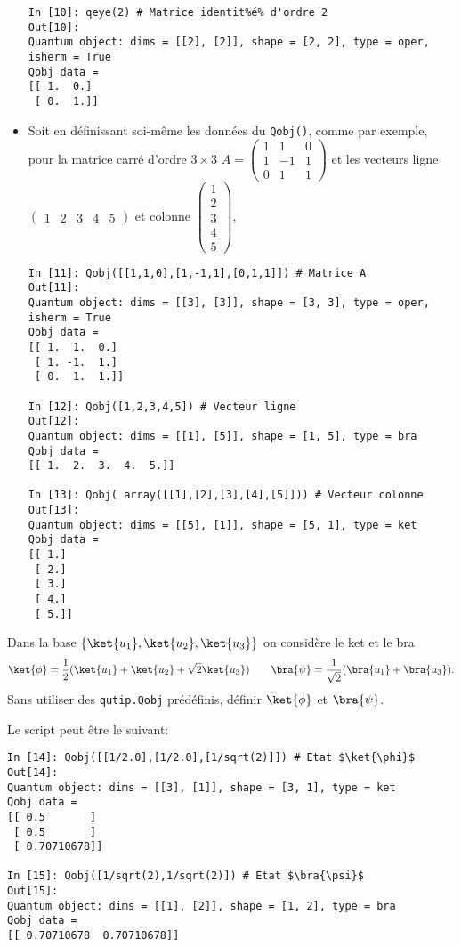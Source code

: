 \begin{itemize}
\begin{lstlisting}
In [10]: qeye(2) # Matrice identit%é% d'ordre 2
Out[10]: 
Quantum object: dims = [[2], [2]], shape = [2, 2], type = oper, isherm = True
Qobj data =
[[ 1.  0.]
 [ 0.  1.]]
\end{lstlisting}

\item Soit en définissant soi-même les données du \texttt{Qobj()}, comme par 
exemple, pour la matrice carré d'ordre $3\times3$ $A =\begin{pmatrix}
1&1&0\\1&-1&1\\0&1&1\end{pmatrix}$ et les vecteurs ligne 
$\begin{pmatrix}1&2&3&4&5\end{pmatrix}$ et colonne 
$\begin{pmatrix}1\\2\\3\\4\\5\end{pmatrix}$,
\begin{lstlisting}
In [11]: Qobj([[1,1,0],[1,-1,1],[0,1,1]]) # Matrice A
Out[11]: 
Quantum object: dims = [[3], [3]], shape = [3, 3], type = oper, isherm = True
Qobj data =
[[ 1.  1.  0.]
 [ 1. -1.  1.]
 [ 0.  1.  1.]]

In [12]: Qobj([1,2,3,4,5]) # Vecteur ligne
Out[12]: 
Quantum object: dims = [[1], [5]], shape = [1, 5], type = bra
Qobj data =
[[ 1.  2.  3.  4.  5.]]

In [13]: Qobj( array([[1],[2],[3],[4],[5]])) # Vecteur colonne
Out[13]: 
Quantum object: dims = [[5], [1]], shape = [5, 1], type = ket
Qobj data =
[[ 1.]
 [ 2.]
 [ 3.]
 [ 4.]
 [ 5.]]
\end{lstlisting}
\end{itemize}

\begin{exercise}
Dans la base $\{\ket{u_1},\ket{u_2},\ket{u_3}\}$ on considère le ket et le bra 
\begin{equation}
\ket{\phi}=\dfrac{1}{2}(\ket{u_1}+\ket{u_2}+\sqrt{2}\ket{u_3}) \qquad 
\bra{\psi}=\dfrac{1}{\sqrt{2}}(\bra{u_1}+\bra{u_3}).
\end{equation}
Sans utiliser des \texttt{qutip.Qobj} prédéfinis, définir $\ket{\phi}$ et 
$\bra{\psi}$.
\end{exercise}

\begin{solution}
Le script peut être le suivant:\\
\begin{lstlisting}
In [14]: Qobj([[1/2.0],[1/2.0],[1/sqrt(2)]]) # Etat $\ket{\phi}$
Out[14]: 
Quantum object: dims = [[3], [1]], shape = [3, 1], type = ket
Qobj data =
[[ 0.5       ]
 [ 0.5       ]
 [ 0.70710678]]

In [15]: Qobj([1/sqrt(2),1/sqrt(2)]) # Etat $\bra{\psi}$
Out[15]: 
Quantum object: dims = [[1], [2]], shape = [1, 2], type = bra
Qobj data =
[[ 0.70710678  0.70710678]]
\end{lstlisting}
\end{solution}

